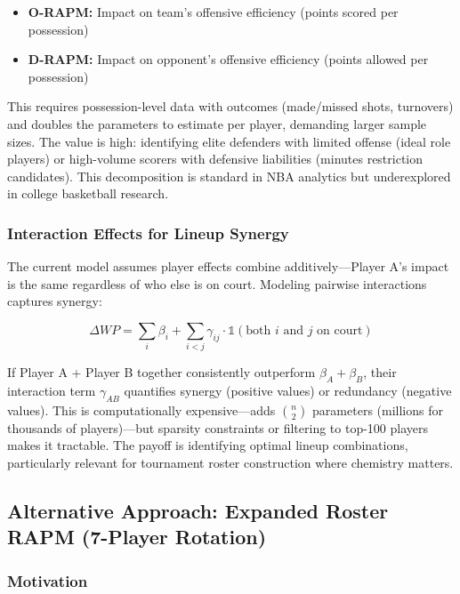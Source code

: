 \documentclass[
  letterpaper,
  DIV=11,
  numbers=noendperiod]{scrartcl}
\providecommand{\tightlist}{%
  \setlength{\itemsep}{0pt}\setlength{\parskip}{0pt}}
\begin{document}
\begin{itemize}
\tightlist
\item
  \textbf{O-RAPM:} Impact on team's offensive efficiency (points scored
  per possession)
\item
  \textbf{D-RAPM:} Impact on opponent's offensive efficiency (points
  allowed per possession)
\end{itemize}

This requires possession-level data with outcomes (made/missed shots,
turnovers) and doubles the parameters to estimate per player, demanding
larger sample sizes. The value is high: identifying elite defenders with
limited offense (ideal role players) or high-volume scorers with
defensive liabilities (minutes restriction candidates). This
decomposition is standard in NBA analytics but underexplored in college
basketball research.

\subsubsection{Interaction Effects for Lineup
Synergy}\label{interaction-effects-for-lineup-synergy}

The current model assumes player effects combine additively---Player A's
impact is the same regardless of who else is on court. Modeling pairwise
interactions captures synergy:

\[\Delta WP = \sum_{i} \beta_i + \sum_{i<j} \gamma_{ij} \cdot \mathbb{1}(\text{both } i \text{ and } j \text{ on court})\]

If Player A + Player B together consistently outperform
\(\beta_A + \beta_B\), their interaction term \(\gamma_{AB}\) quantifies
synergy (positive values) or redundancy (negative values). This is
computationally expensive---adds \(\binom{n}{2}\) parameters (millions
for thousands of players)---but sparsity constraints or filtering to
top-100 players makes it tractable. The payoff is identifying optimal
lineup combinations, particularly relevant for tournament roster
construction where chemistry matters.

\subsection{Alternative Approach: Expanded Roster RAPM (7-Player
Rotation)}\label{alternative-approach-expanded-roster-rapm-7-player-rotation}

\subsubsection{Motivation}\label{motivation}
\end{document}
